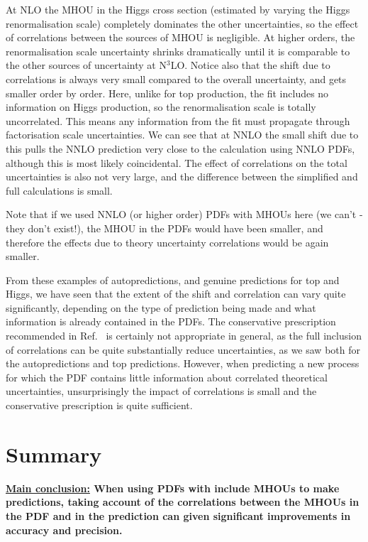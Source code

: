 At NLO the MHOU in the Higgs cross section (estimated by varying the Higgs renormalisation scale) completely dominates the other uncertainties, so the effect of correlations between the sources of MHOU is negligible.  At higher orders, the renormalisation scale uncertainty shrinks dramatically until it is comparable to the other sources of uncertainty at N$^3$LO. Notice also that the shift due to correlations is always very small compared to the overall uncertainty, and gets smaller order by order. Here, unlike for top production, the fit includes no information on Higgs production, so the renormalisation scale is totally uncorrelated. This means any information from the fit must propagate through factorisation scale uncertainties. We can see that at NNLO the small shift due to this pulls the NNLO prediction very close to the calculation using NNLO PDFs, although this is most likely coincidental. The effect of correlations on the total uncertainties is also not very large, and the difference between the simplified and full calculations is small. 

Note that if we used NNLO (or higher order) PDFs with MHOUs here (we can't - they don't exist!), the MHOU in the PDFs would have been smaller, and therefore the effects due to theory uncertainty correlations would be again smaller.

From these examples of autopredictions, and genuine predictions for top and Higgs, we have seen that the extent of the shift and correlation can vary quite significantly, depending on the type of prediction being made and what information is already contained in the PDFs. The conservative prescription recommended in Ref.~\cite{AbdulKhalek:2019ihb} is certainly not appropriate in general, as the full inclusion of correlations can be quite substantially reduce uncertainties, as we saw both for the autopredictions and top predictions. However, when predicting a new process for which the PDF contains little information about correlated theoretical uncertainties, unsurprisingly the impact of correlations is small and the conservative prescription is quite sufficient.

\newpage
\section{Summary}
\label{sec:p5}

{\bf \underline{Main conclusion:} When using PDFs with include MHOUs to make predictions, taking account of the correlations between the MHOUs in the PDF and in the prediction can given significant improvements in accuracy and precision.}

